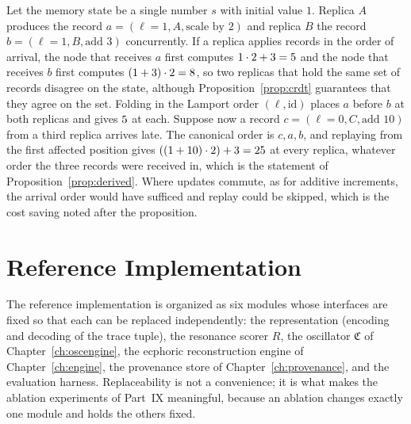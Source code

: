 \begin{workedex}\label{ex:replica44}
Let the memory state be a single number $s$ with initial value $1$. Replica $A$ produces the record $a=(\ell{=}1,A,\text{scale by }2)$ and replica $B$ the record $b=(\ell{=}1,B,\text{add }3)$ concurrently. If a replica applies records in the order of arrival, the node that receives $a$ first computes $1\cdot2+3=5$ and the node that receives $b$ first computes $(1+3)\cdot2=8$, so two replicas that hold the same set of records disagree on the state, although Proposition~\ref{prop:crdt} guarantees that they agree on the set. Folding in the Lamport order $(\ell,\mathrm{id})$ places $a$ before $b$ at both replicas and gives $5$ at each. Suppose now a record $c=(\ell{=}0,C,\text{add }10)$ from a third replica arrives late. The canonical order is $c,a,b$, and replaying from the first affected position gives $((1+10)\cdot2)+3=25$ at every replica, whatever order the three records were received in, which is the statement of Proposition~\ref{prop:derived}. Where updates commute, as for additive increments, the arrival order would have sufficed and replay could be skipped, which is the cost saving noted after the proposition.
\end{workedex}


\chapter{Reference Implementation}\label{ch:refimpl}

The reference implementation is organized as six modules whose interfaces are fixed so that each can be replaced independently: the representation (encoding and decoding of the trace tuple), the resonance scorer $R$, the oscillator $\mathfrak C$ of Chapter~\ref{ch:oscengine}, the ecphoric reconstruction engine of Chapter~\ref{ch:engine}, the provenance store of Chapter~\ref{ch:provenance}, and the evaluation harness. Replaceability is not a convenience; it is what makes the ablation experiments of Part~IX meaningful, because an ablation changes exactly one module and holds the others fixed.



